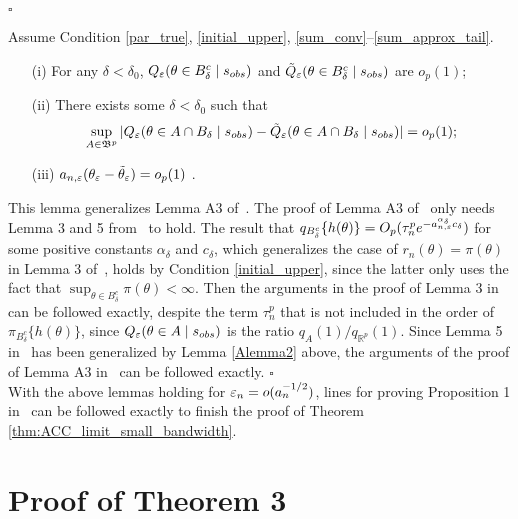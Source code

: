 	\hfill{$\square$} 
	
\begin{lemma}\label{Alemma4} 
Assume Condition \ref{par_true}, \ref{initial_upper}, \ref{sum_conv}--\ref{sum_approx_tail}. 
	\begin{enumerate}
		\item[(i)] For any $\delta<\delta_{0}$, $Q_{\varepsilon}(\theta\in B_{\delta}^{c}\mid s_{\relax obs})$
		and $\tilde{Q}_{\varepsilon}(\theta\in B_{\delta}^{c}\mid s_{\relax obs})$ are $o_{p}(1)$; 
		\item[(ii)] There exists some $\delta<\delta_{0}$ such that 
		\[
		\sup_{A\in\mathfrak{B}^{p}}|Q_{\varepsilon}(\theta\in A\cap B_{\delta}\mid s_{\relax obs})-\tilde{Q}_{\varepsilon}(\theta\in A\cap B_{\delta}\mid s_{\relax obs})|=o_{p}(1);
		\]
		\item[(iii)] $a_{n,\varepsilon}(\theta_{\varepsilon}-\tilde{\theta}_{\varepsilon})=o_{p}(1)$ . 
	\end{enumerate}\end{lemma}
	This lemma generalizes Lemma A3 of~\cite{Li2017}. The proof of Lemma A3 of~\cite{Li2017} only needs Lemma 3 and 5 from~\cite{Li2016} to hold. The result that  $q_{B_{\delta}^{c}}\{h(\theta)\}=O_{p}(\tau_{n}^{p}e^{-a_{n,\varepsilon}^{\alpha_{\delta}}c_{\delta}})$
	for some positive constants $\alpha_{\delta}$ and $c_{\delta}$, which generalizes the case of $r_{n}(\theta)=\pi(\theta)$ in Lemma 3 of~\cite{Li2016}, holds by Condition \ref{initial_upper}, since the latter only uses the fact that 
	$\sup_{\theta\in B_{\delta}^{c}}\pi(\theta)<\infty$.
	Then the arguments in the proof of Lemma 3 in~\cite{Li2016} can be followed exactly, despite the term $\tau_{n}^{p}$ that is not included in the order of $\pi_{B_{\delta}^{c}}\{h(\theta)\}$, since $Q_{\varepsilon}(\theta\in A\mid s_{{\relax obs}})$
	is the ratio $q_{A}(1)/q_{\mathbb{R}^{p}}(1)$. Since Lemma 5 in~\cite{Li2016} has been generalized by Lemma \eqref{Alemma2} above, the arguments of the proof of Lemma A3 in~\cite{Li2017} can be followed exactly.
	\hfill{$\square$} \\
	

With the above lemmas holding for $\varepsilon_n = o(a_n^{-1/2})$, lines for
proving Proposition 1 in~\cite{Li2017} can be followed  
exactly to finish the proof of Theorem \ref{thm:ACC_limit_small_bandwidth}. 


\section{Proof of Theorem 3}


